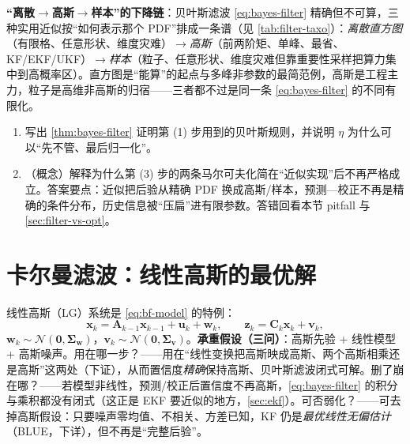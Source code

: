 \begin{insight}
\textbf{“离散$\to$高斯$\to$样本”的下降链}：贝叶斯滤波 \cref{eq:bayes-filter} 精确但不可算，三种实用近似按“如何表示那个 PDF”排成一条谱（见 \cref{tab:filter-taxo}）：\emph{离散直方图}（有限格、任意形状、维度灾难）$\to$\emph{高斯}（前两阶矩、单峰、最省、KF/EKF/UKF）$\to$\emph{样本}（粒子、任意形状、维度灾难但靠重要性采样把算力集中到高概率区）。直方图是“能算”的起点与多峰非参数的最简范例，高斯是工程主力，粒子是高维非高斯的归宿——三者都不过是同一条 \cref{eq:bayes-filter} 的不同有限化。
\end{insight}

\begin{practice}
\begin{enumerate}
  \item 写出 \cref{thm:bayes-filter} 证明第 (1) 步用到的贝叶斯规则，并说明 $\eta$ 为什么可以“先不管、最后归一化”。
  \item （概念）解释为什么第 (3) 步的两条马尔可夫化简在“近似实现”后不再严格成立。答案要点：近似把后验从精确 PDF 换成高斯/样本，预测—校正不再是精确的条件分布，历史信息被“压扁”进有限参数。答错回看本节 pitfall 与 \cref{sec:filter-vs-opt}。
\end{enumerate}
\end{practice}

\section{卡尔曼滤波：线性高斯的最优解}
\label{sec:kf}

线性高斯（LG）系统是 \cref{eq:bf-model} 的特例：
\begin{equation}
  \mathbf{x}_k=\mathbf{A}_{k-1}\mathbf{x}_{k-1}+\mathbf{u}_k+\mathbf{w}_k,\qquad
  \mathbf{z}_k=\mathbf{C}_k\mathbf{x}_k+\mathbf{v}_k,
  \label{eq:lg-model}
\end{equation}
$\mathbf{w}_k\sim\mathcal{N}(\mathbf{0},\boldsymbol{\Sigma}_{\mathbf{w}})$，$\mathbf{v}_k\sim\mathcal{N}(\mathbf{0},\boldsymbol{\Sigma}_{\mathbf{v}})$。\textbf{承重假设（三问）}：高斯先验 + 线性模型 + 高斯噪声。用在哪一步？——用在“线性变换把高斯映成高斯、两个高斯相乘还是高斯”这两处（下证），从而置信度\emph{精确}保持高斯、贝叶斯滤波闭式可解。删了崩在哪？——若模型非线性，预测/校正后置信度不再高斯，\cref{eq:bayes-filter} 的积分与乘积都没有闭式（这正是 EKF 要近似的地方，\cref{sec:ekf}）。可否弱化？——可去掉高斯假设：只要噪声零均值、不相关、方差已知，KF 仍是\emph{最优线性无偏估计}（BLUE，下详），但不再是“完整后验”。

